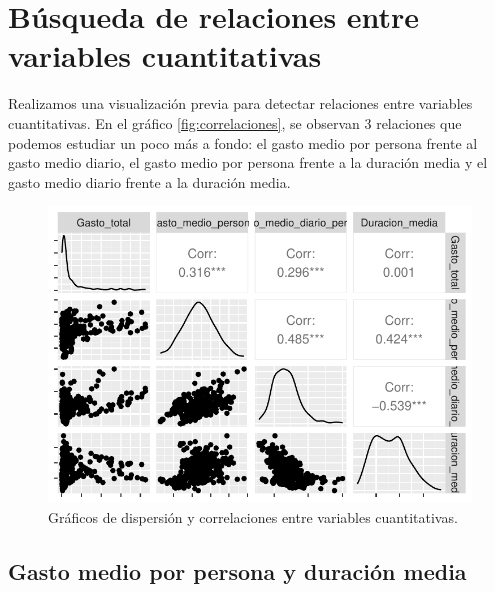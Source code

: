 \documentclass[data,article,submit,moreauthors,pdftex]{Definitions/mdpi}
\begin{document}
\section{Búsqueda de relaciones entre variables
cuantitativas}\label{buxfasqueda-de-relaciones-entre-variables-cuantitativas}

Realizamos una visualización previa para detectar relaciones entre
variables cuantitativas. En el gráfico \ref{fig:correlaciones}, se
observan 3 relaciones que podemos estudiar un poco más a fondo: el gasto
medio por persona frente al gasto medio diario, el gasto medio por
persona frente a la duración media y el gasto medio diario frente a la
duración media.

\begin{figure}[H]
\includegraphics{ProyectoAED2024_Rmd_files/figure-latex/unnamed-chunk-35-1} \caption{Gráficos de dispersión y correlaciones entre variables cuantitativas.\label{fig:correlaciones}}\label{fig:unnamed-chunk-35}
\end{figure}

\subsection{Gasto medio por persona y duración
media}\label{gasto-medio-por-persona-y-duraciuxf3n-media}
\end{document}
